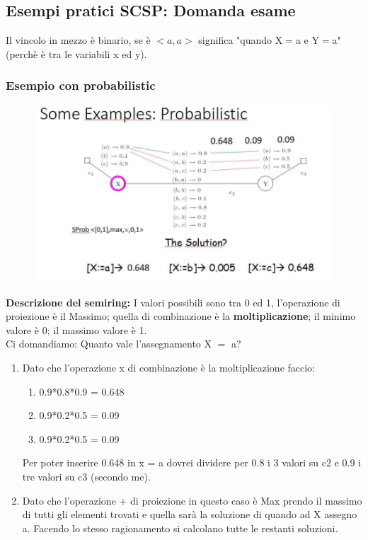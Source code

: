 \subsection{Esempi pratici SCSP: Domanda esame}
Il vincolo in mezzo è binario, se è $< a, a >$ significa "quando X$=$a e Y$=$a" (perchè è tra le variabili x ed y).
\subsubsection{Esempio con probabilistic}
\begin{figure}[htp]
	\centering
    \includegraphics[width=13cm, keepaspectratio]{img/Cap4/probabilistic.png}
\end{figure}
\textbf{Descrizione del semiring:} I valori possibili sono tra 0 ed 1, l’operazione
di proiezione è il Massimo; quella di combinazione è la \textbf{moltiplicazione}; il minimo valore è 0; il massimo valore è 1. 
\\Ci domandiamo: Quanto vale l’assegnamento X $=$ a?
\begin{enumerate}
    \item Dato che l’operazione x di combinazione è la moltiplicazione faccio:
    \begin{enumerate}
        \item 0.9*0.8*0.9 = 0.648
        \item 0.9*0.2*0.5 = 0.09
        \item 0.9*0.2*0.5 = 0.09
    \end{enumerate}
    Per poter inserire 0.648 in x = a dovrei dividere per 0.8 i 3 valori su c2 e 0.9 i tre valori su c3 (secondo me).
    \item Dato che l’operazione + di proiezione in questo caso è Max prendo il massimo di tutti gli elementi trovati e quella sarà la soluzione di quando ad X assegno a.
    Facendo lo stesso ragionamento si calcolano tutte le restanti soluzioni.
\end{enumerate}
\newpage
